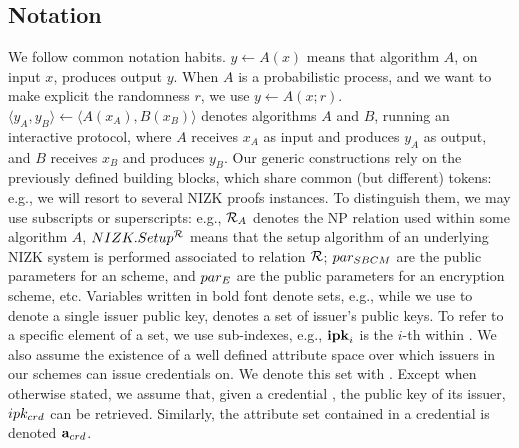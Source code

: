 \subsection{Notation}
\label{ssec:notation}

We follow common notation habits. $y \gets A(x)$ means that algorithm $A$, on
input $x$, produces output $y$. When $A$ is a probabilistic process, and we want
to make explicit the randomness $r$, we use $y \gets A(x;r)$. $\langle y_A,y_B
\rangle \gets \langle A(x_A),B(x_B)\rangle$ denotes algorithms $A$ and $B$,
running an interactive protocol, where $A$ receives $x_A$ as input and produces
$y_A$ as output, and $B$ receives $x_B$ and produces $y_B$.
%
Our generic constructions rely on the previously defined building blocks, which
share common (but different)
tokens: e.g., we will resort to several NIZK proofs instances. To distinguish
them, we may use subscripts or superscripts: e.g., $\mathcal{R}_A$ denotes the
NP relation used within some algorithm $A$, $NIZK.Setup^{\mathcal{R}}$ means that
the setup algorithm of an underlying NIZK system is performed associated to
relation $\mathcal{R}$; $par_{SBCM}$ are the public parameters for an \SBCM scheme,
and $par_{E}$ are the public parameters for an encryption scheme, etc. Variables
written in bold font denote sets, e.g., while we use \ipk to denote a single
issuer public key, \sipk denotes a set of issuer's public keys. To refer to
a specific element of a set, we use sub-indexes, e.g., $\mathbf{ipk}_i$ is the $i$-th
\ipk within \sipk.
%
We also assume the existence of a well defined attribute space over which
issuers in our schemes can issue credentials on. We denote this set with
\AttrSpace.
%
Except when otherwise stated, we assume that, given a credential \cred, the
public key of its issuer, $ipk_{crd}$ can be retrieved. Similarly, the
attribute set contained in a credential \cred is denoted $\mathbf{a}_{crd}$.

